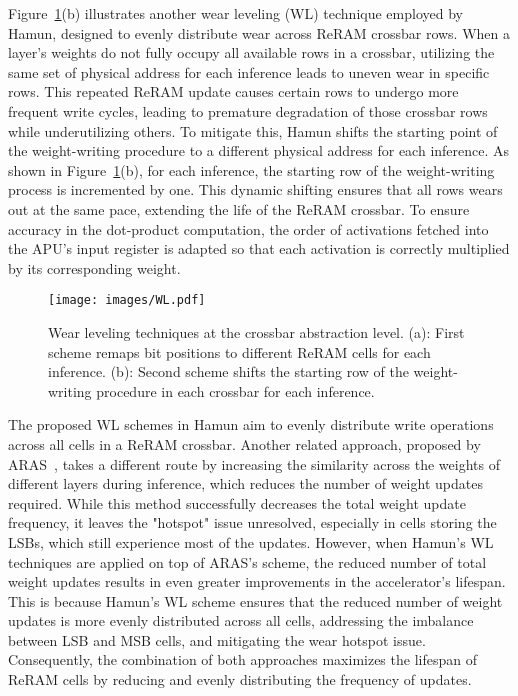 Figure~\ref{fig:wl}(b) illustrates another wear leveling (WL) technique employed by Hamun, designed to evenly distribute wear across ReRAM crossbar rows. When a layer’s weights do not fully occupy all available rows in a crossbar, utilizing the same set of physical address for each inference leads to uneven wear in specific rows. This repeated ReRAM update causes certain rows to undergo more frequent write cycles, leading to premature degradation of those crossbar rows while underutilizing others. To mitigate this, Hamun shifts the starting point of the weight-writing procedure to a different physical address for each inference. As shown in Figure~\ref{fig:wl}(b), for each inference, the starting row of the weight-writing process is incremented by one. This dynamic shifting ensures that all rows wears out at the same pace, extending the life of the ReRAM crossbar. To ensure accuracy in the dot-product computation, the order of activations fetched into the APU’s input register is adapted so that each activation is correctly multiplied by its corresponding weight.

\begin{figure}[t!]
    \centering
    \texttt{[image: images/WL.pdf]}
    \vskip -0.1in
    \caption{Wear leveling techniques at the crossbar abstraction level. (a): First scheme remaps bit positions to different ReRAM cells for each inference. (b): Second scheme shifts the starting row of the weight-writing procedure in each crossbar for each inference.}
    \label{fig:wl}
    \vskip -0.20in
\end{figure}

The proposed WL schemes in Hamun aim to evenly distribute write operations across all cells in a ReRAM crossbar. Another related approach, proposed by ARAS~\cite{ARAS}, takes a different route by increasing the similarity across the weights of different layers during inference, which reduces the number of weight updates required. While this method successfully decreases the total weight update frequency, it leaves the "hotspot" issue unresolved, especially in cells storing the LSBs, which still experience most of the updates. However, when Hamun's WL techniques are applied on top of ARAS's scheme, the reduced number of total weight updates results in even greater improvements in the accelerator's lifespan. This is because Hamun's WL scheme ensures that the reduced number of weight updates is more evenly distributed across all cells, addressing the imbalance between LSB and MSB cells, and mitigating the wear hotspot issue. Consequently, the combination of both approaches maximizes the lifespan of ReRAM cells by reducing and evenly distributing the frequency of updates.

